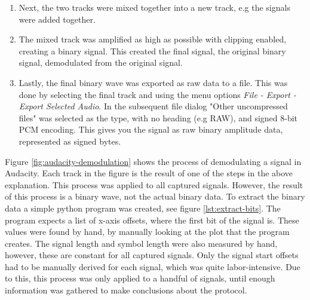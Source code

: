 \begin{enumerate}
    \item Next, the two tracks were mixed together into a new track, e.g the signals were added together.

    \item The mixed track was amplified as high as possible with clipping enabled, creating a binary signal. This created the final signal, the original binary signal, demodulated from the original signal.
    
    \item Lastly, the final binary wave was exported as raw data to a file. This was done by selecting the final track and using the menu options \textit{File - Export - Export Selected Audio}. In the subsequent file dialog "Other uncompressed files" was selected as the type, with no heading (e.g RAW), and signed 8-bit PCM encoding. This gives you the signal as raw binary amplitude data, represented as signed bytes.
\end{enumerate}
Figure \ref{fig:audacity-demodulation} shows the process of demodulating a signal in Audacity. Each track in the figure is the result of one of the steps in the above explanation. This process was applied to all captured signals. However, the result of this process is a binary wave, not the actual binary data. To extract the binary data a simple python program was created, see figure \ref{lst:extract-bits}. The program expects a list of x-axis offsets, where the first bit of the signal is. These values were found by hand, by manually looking at the plot that the program creates. The signal length and symbol length were also measured by hand, however, these are constant for all captured signals. Only the signal start offsets had to be manually derived for each signal, which was quite labor-intensive. Due to this, this process was only applied to a handful of signals, until enough information was gathered to make conclusions about the protocol.
